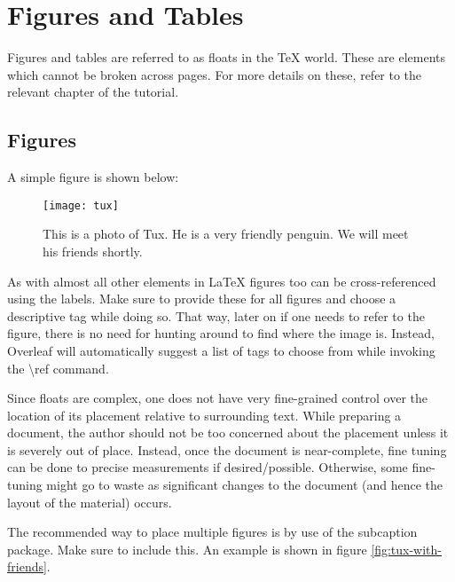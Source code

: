 \chapter{Figures and Tables}

Figures and tables are referred to as floats in the {\TeX} world. These are
elements which cannot be broken across pages. For more details on these, refer
to the relevant chapter of the tutorial.
%
%
%
%
\section{Figures}
A simple figure is shown below:

\begin{figure}[h]
\centering
\texttt{[image: tux]}
\label{fig:tux}
\caption{This is a photo of Tux. He is a very friendly penguin. We will meet
his friends shortly.}
\end{figure}

As with almost all other elements in {\LaTeX} figures too can be
cross-referenced using the labels. Make sure to provide these for all figures
and choose a descriptive tag while doing so. That way, later on if one needs to
refer to the figure, there is no need for hunting around to find where the
image is. Instead, Overleaf will automatically suggest a list of tags to
choose from while invoking the {\ttfamily \textbackslash ref} command.

Since floats are complex, one does not have very fine-grained control over the
location of its placement relative to surrounding text. While preparing a
document, the author should not be too concerned about the placement unless it
is severely out of place. Instead, once the document is near-complete, fine
tuning can be done to precise measurements if desired/possible. Otherwise, some
fine-tuning might go to waste as significant changes to the document (and hence
the layout of the material) occurs.

The recommended way to place multiple figures is by use of the
{\ttfamily subcaption} package. Make sure to include this.
An example is shown in figure \ref{fig:tux-with-friends}.


